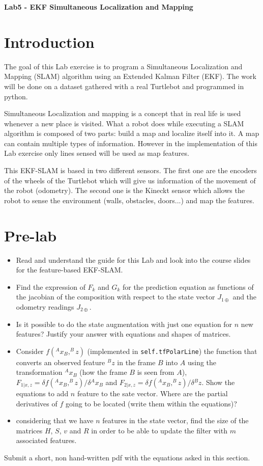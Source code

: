 \documentclass[a4paper,10pt]{article}
\begin{document}
\marginsize{2cm}{2cm}{2cm}{2cm}

\begin{center}
\Large \textbf{Lab5 - EKF Simultaneous Localization and Mapping}
\end{center}

\section{Introduction}
The goal of this Lab exercise is to program a Simultaneous Localization and Mapping (SLAM) algorithm using an Extended Kalman Filter (EKF). The work will be done on a dataset gathered with a real Turtlebot and programmed in python.

Simultaneous Localization and mapping is a concept that in real life is used whenever a new place is visited. What a robot does while executing a SLAM algorithm is composed of two parts: build a map and localize itself into it. A map can contain multiple types of information. However in the implementation of this Lab exercise only lines sensed will be used as map features.

This EKF-SLAM is based in two different sensors. The first one are the encoders of the wheels of the Turtlebot which will give us information of the movement of the robot (odometry). The second one is the Kineckt sensor which allows the robot to sense the environment (walls, obstacles, doors...) and map the features.

\section{Pre-lab}
\begin{itemize}
	\item Read and understand the guide for this Lab and look into the course slides for the feature-based EKF-SLAM.
	\item Find the expression of $F_k$ and $G_k$ for the prediction equation as functions of the jacobian of the composition with respect to the state vector $J_{1\oplus}$ and the odometry readings $J_{2\oplus}$.
	\item Is it possible to do the state augmentation with just one equation for $n$ new features? Justify your answer with equations and shapes of matrices.
	\item Consider $f(^Ax_B,^Bz)$ (implemented in \texttt{self.tfPolarLine}) the function that converts an observed feature $^Bz$ in the frame $B$ into $A$ using the transformation $^Ax_B$ (how the frame $B$ is seen from  $A$), $F_{1|x,z}=\delta f(^Ax_B,^Bz) / \delta {^Ax_B}$ and $F_{2|x,z}=\delta f(^Ax_B,^Bz) / \delta{^Bz}$. Show the equations to add $n$ feature to the sate vector. Where are the partial derivatives of $f$ going to be located (write them within the equations)? 
	\item considering that we have $n$ features in the state vector, find the size of the matrices $H$, $S$, $v$ and $R$ in order to be able to update the filter with $m$ associated features.
\end{itemize}
Submit a short, non hand-written pdf with the equations asked in this section.
\end{document}

